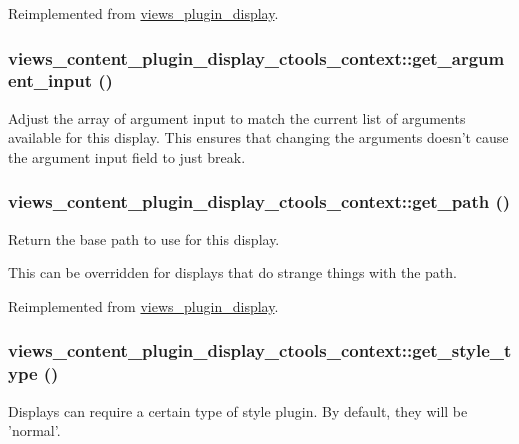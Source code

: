 Reimplemented from \hyperlink{classviews__plugin__display_af99c4a303d3e409ab7b14c6cfcd3a1d8}{views\_\-plugin\_\-display}.\hypertarget{classviews__content__plugin__display__ctools__context_a01a8b7e0f1b7a8200a1a65386aa8921f}{
\subsubsection[{get\_\-argument\_\-input}]{\setlength{\rightskip}{0pt plus 5cm}views\_\-content\_\-plugin\_\-display\_\-ctools\_\-context::get\_\-argument\_\-input ()}}
\label{classviews__content__plugin__display__ctools__context_a01a8b7e0f1b7a8200a1a65386aa8921f}
Adjust the array of argument input to match the current list of arguments available for this display. This ensures that changing the arguments doesn't cause the argument input field to just break. \hypertarget{classviews__content__plugin__display__ctools__context_ae11e60c8046dcac9210f4c097606a4b7}{
\subsubsection[{get\_\-path}]{\setlength{\rightskip}{0pt plus 5cm}views\_\-content\_\-plugin\_\-display\_\-ctools\_\-context::get\_\-path ()}}
\label{classviews__content__plugin__display__ctools__context_ae11e60c8046dcac9210f4c097606a4b7}
Return the base path to use for this display.

This can be overridden for displays that do strange things with the path. 

Reimplemented from \hyperlink{classviews__plugin__display_ac9a045f84e31fbe0513482170bd61c01}{views\_\-plugin\_\-display}.\hypertarget{classviews__content__plugin__display__ctools__context_a885535a2ef690f2bf5ccefef707b7d3c}{
\subsubsection[{get\_\-style\_\-type}]{\setlength{\rightskip}{0pt plus 5cm}views\_\-content\_\-plugin\_\-display\_\-ctools\_\-context::get\_\-style\_\-type ()}}
\label{classviews__content__plugin__display__ctools__context_a885535a2ef690f2bf5ccefef707b7d3c}
Displays can require a certain type of style plugin. By default, they will be 'normal'. 

